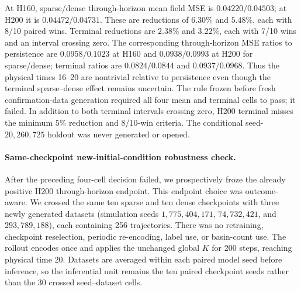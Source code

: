At H160, sparse/dense through-horizon mean field MSE is
$0.04220/0.04503$; at H200 it is $0.04472/0.04731$. These are reductions of
$6.30\%$ and $5.48\%$, each with 8/10 paired wins. Terminal reductions are
$2.38\%$ and $3.22\%$, each with 7/10 wins and an interval crossing zero.
The corresponding through-horizon MSE ratios to persistence are
$0.0958/0.1023$ at H160 and $0.0938/0.0993$ at H200 for sparse/dense;
terminal ratios are $0.0824/0.0844$ and $0.0937/0.0968$. Thus the physical
times 16--20 are nontrivial relative to persistence even though the terminal
sparse--dense effect remains uncertain.
The rule frozen before fresh confirmation-data generation required all four
mean and terminal cells to pass; it failed.
In addition to both terminal intervals crossing zero, H200 terminal misses the
minimum $5\%$ reduction and 8/10-win criteria.
The conditional seed-$20{,}260{,}725$ holdout was never generated or opened.

\paragraph{Same-checkpoint new-initial-condition robustness check.}
After the preceding four-cell decision failed, we prospectively froze the
already positive H200 through-horizon endpoint. This endpoint choice was
outcome-aware. We crossed the same ten sparse and ten dense checkpoints with
three newly generated datasets (simulation seeds $1{,}775{,}404{,}171$,
$74{,}732{,}421$, and $293{,}789{,}188$), each containing 256 trajectories.
There was no retraining, checkpoint reselection, periodic re-encoding, label
use, or basin-count use. The rollout encodes once and applies the unchanged
global $K$ for 200 steps, reaching physical time 20. Datasets are averaged
within each paired model seed before inference, so the inferential unit remains
the ten paired checkpoint seeds rather than the 30 crossed seed--dataset cells.

